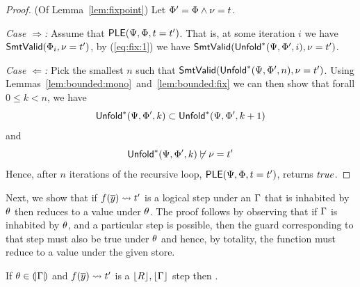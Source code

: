 \begin{proof} (Of Lemma~\ref{lem:fixpoint})
Let $\Phi' = \Phi \wedge \nu = t$.

\emph{Case $\Rightarrow$:}
Assume that $\mathsf{PLE}(\Psi,\Phi,t = t')$.
That is, at some iteration $i$ we have
$\mathsf{SmtValid}(\Phi_i, \nu = t')$,
\ie by (\ref{eq:fix:1}) we have
$\mathsf{SmtValid}(\mathsf{Unfold}^{*}(\Psi,\Phi',i), \nu = t')$.

\emph{Case $\Leftarrow$:}
Pick the smallest $n$ such that
$\mathsf{SmtValid}(\mathsf{Unfold}^{*}(\Psi,\Phi',n), \nu = t')$.
Using Lemmas~\ref{lem:bounded:mono}~and~\ref{lem:bounded:fix}
we can then show that forall $0 \leq k < n$, we have
%
$$
\mathsf{Unfold}^{*}(\Psi,\Phi',k) \subset \mathsf{Unfold}^{*}(\Psi,\Phi',k+1)
$$
%
and
%
$$\binst{\Renv}{\Penv'}{k} \not \vdash {\vv = \expr'}$$
%
Hence, after $n$ iterations of the recursive loop,
$\mathsf{PLE}(\Psi,\Phi,t = t')$, returns $\mathit{true}$.
\end{proof}

%
Next, we show that if
$f({\overline{y}}) \rightsquigarrow t'$
is a logical step under an $\Gamma$
that is inhabited by $\theta$
then  reduces
to a value under $\theta$.
%
The proof follows by observing
that if $\Gamma$ is inhabited by
$\theta$, and a particular step
is possible, then the guard
corresponding to that step
must also be true under
$\theta$ and hence, by totality,
the function must reduce to
a value under the given store.


\begin{lemma}\label{lem:step-value}
If   $\theta \in (\!|\Gamma|\!)$
     and
     $f({\overline{y}}) \rightsquigarrow t'$
	   is a $\lfloor R\rfloor , \lfloor \Gamma\rfloor $ step
then .
\end{lemma}


